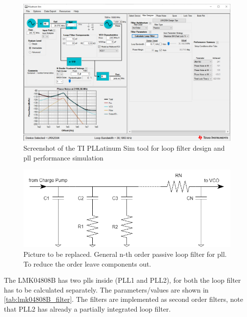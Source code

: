 \begin{figure}[tbh]
	\centering
	\includegraphics[width = \textwidth]{chap/04-work/img/pll.PNG}
	\caption[PLL block diagram]{Screenshot of the TI PLLatinum Sim tool for loop filter design and \gls{pll} performance simulation}
	\label{fig:ti_pll}
\end{figure}


\begin{figure}[tbh]
	\centering
	\includegraphics[width = \textwidth]{chap/04-work/img/loop_filter}
	\caption[PLL loop filter components]{Picture to be replaced. General n-th order passive loop filter for \gls{pll}. To reduce the order leave components out.}
	\label{fig:loop_filter}
\end{figure}

The LMK04808B has two \glspl{pll} inside (PLL1 and PLL2), for both the loop filter has to be calculated separately. The parameters/values are shown in \autoref{tab:lmk04808B_filter}.
The filters are implemented as second order filters, note that PLL2 has already a partially integrated loop filter.

